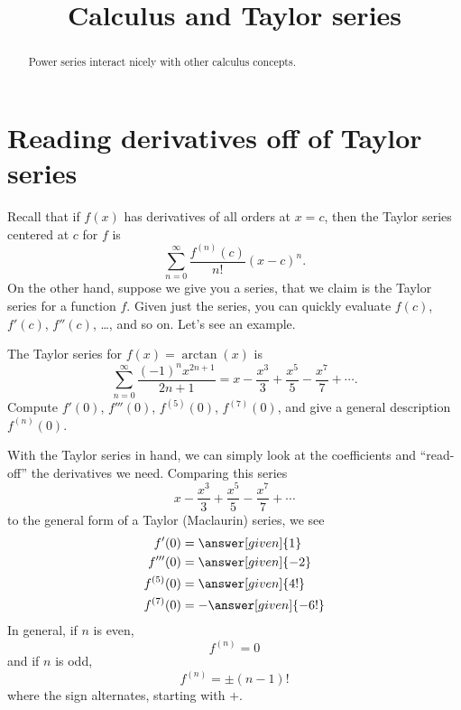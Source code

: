 \documentclass{ximera}
\title[Dig-In:]{Calculus and Taylor series}
\begin{document}
\begin{abstract}
  Power series interact nicely with other calculus concepts.
\end{abstract}
\maketitle

\section{Reading derivatives off of Taylor series}

Recall that if $f(x)$ has derivatives of all orders at $x=c$, then the
Taylor series centered at $c$ for $f$ is
\[
\sum_{n=0}^\infty \frac{f^{(n)}(c)}{n!}(x-c)^n.
\]
On the other hand, suppose we give you a series, that we claim is the
Taylor series for a function $f$. Given just the series, you can
quickly evaluate $f(c)$, $f'(c)$, $f''(c)$, \dots, and so on. Let's
see an example.

\begin{example}
  The Taylor series for $f(x) = \arctan(x)$ is
  \[
  \sum_{n=0}^\infty \frac{(-1)^n x^{2n+1}}{2n+1} = x - \frac{x^3}{3} + \frac{x^5}{5} - \frac{x^7}{7} +\cdots.
  \]
  Compute $f'(0)$, $f'''(0)$, $f^{(5)}(0)$, $f^{(7)}(0)$, and give a
  general description $f^{(n)}(0)$.
  \begin{explanation}
    With the Taylor series in hand, we can simply look at the
    coefficients and ``read-off'' the derivatives we need. Comparing this series
    \[
    x - \frac{x^3}{3} + \frac{x^5}{5} - \frac{x^7}{7} +\cdots
    \]
    to the general form of a Taylor (Maclaurin) series, we see
    \begin{align*}
    f'(0) &= \answer[given]{1}\\
    f'''(0) &= \answer[given]{-2}\\
    f^{(5)}(0) &= \answer[given]{4!}\\
    f^{(7)}(0) &= -\answer[given]{-6!}
    \end{align*}
    In general, if $n$ is even,
    \[
    f^{(n)} = 0
    \]
    and if $n$ is odd,
    \[
    f^{(n)} = \pm(n-1)! 
    \]
    where the sign alternates, starting with $+$.
  \end{explanation}
\end{example}
\end{document}
